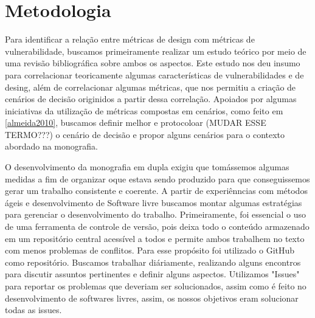 \section{Metodologia}
\label{sec:methodology}

Para identificar a relação entre métricas de design com métricas de vulnerabilidade, buscamos primeiramente  realizar um estudo teórico por meio de uma revisão bibliográfica sobre ambos os aspectos. Este estudo nos deu insumo para correlacionar teoricamente algumas características de vulnerabilidades e de desing, além de correlacionar algumas métricas, que nos permitiu a criação de cenários de decisão originidos a partir dessa correlação. Apoiados por algumas iniciativas da utilização de métricas compostas em cenários, como feito em \ref{almeida2010}, buscamos definir melhor e protocoloar (MUDAR ESSE TERMO???) o cenário de decisão e propor alguns cenários para o contexto abordado na monografia.

O desenvolvimento da monografia em dupla exigiu que tomássemos algumas medidas a fim de organizar oque estava sendo produzido para que conseguissemos gerar um trabalho consistente e coerente. A partir de experiênncias com métodos ágeis e desenvolvimento de Software livre buscamos montar algumas estratégias para gerenciar o desenvolvimento do trabalho. Primeiramente, foi essencial o uso de uma ferramenta de controle de versão,  pois deixa todo o conteúdo armazenado em um repositório central acessível a todos e permite ambos trabalhem no texto com menos problemas de conflitos. Para esse propósito foi utilizado o GitHub como repositório. Buscamos trabalhar diáriamente, realizando alguns encontros para discutir assuntos pertinentes e definir alguns aspectos. Utilizamos "Issues" para reportar os problemas que deveriam ser solucionados, assim como é feito no desenvolvimento de softwares livres, assim, os nossos objetivos eram solucionar todas as issues.   
